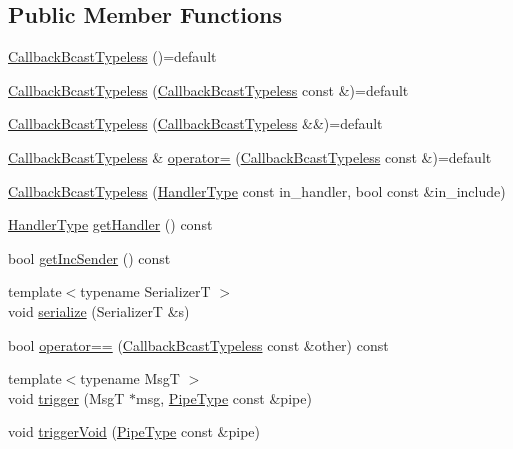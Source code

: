 \subsection*{Public Member Functions}
\begin{DoxyCompactItemize}
\item 
\hyperlink{structvt_1_1pipe_1_1callback_1_1_callback_bcast_typeless_a4f41ee712c6d8359f2702731cdb508e0}{Callback\+Bcast\+Typeless} ()=default
\item 
\hyperlink{structvt_1_1pipe_1_1callback_1_1_callback_bcast_typeless_a21bda4efe28c82f442bf0881b1148196}{Callback\+Bcast\+Typeless} (\hyperlink{structvt_1_1pipe_1_1callback_1_1_callback_bcast_typeless}{Callback\+Bcast\+Typeless} const \&)=default
\item 
\hyperlink{structvt_1_1pipe_1_1callback_1_1_callback_bcast_typeless_a47d8224353671c6a7769abaed3a032ed}{Callback\+Bcast\+Typeless} (\hyperlink{structvt_1_1pipe_1_1callback_1_1_callback_bcast_typeless}{Callback\+Bcast\+Typeless} \&\&)=default
\item 
\hyperlink{structvt_1_1pipe_1_1callback_1_1_callback_bcast_typeless}{Callback\+Bcast\+Typeless} \& \hyperlink{structvt_1_1pipe_1_1callback_1_1_callback_bcast_typeless_acad87bb1887561979d41c298896463e3}{operator=} (\hyperlink{structvt_1_1pipe_1_1callback_1_1_callback_bcast_typeless}{Callback\+Bcast\+Typeless} const \&)=default
\item 
\hyperlink{structvt_1_1pipe_1_1callback_1_1_callback_bcast_typeless_a0681b9d932d75c7c1390e8297258584e}{Callback\+Bcast\+Typeless} (\hyperlink{namespacevt_af64846b57dfcaf104da3ef6967917573}{Handler\+Type} const in\+\_\+handler, bool const \&in\+\_\+include)
\item 
\hyperlink{namespacevt_af64846b57dfcaf104da3ef6967917573}{Handler\+Type} \hyperlink{structvt_1_1pipe_1_1callback_1_1_callback_bcast_typeless_a15f773a711d9771b8c60683de2762bc8}{get\+Handler} () const
\item 
bool \hyperlink{structvt_1_1pipe_1_1callback_1_1_callback_bcast_typeless_a3a93cb6e0ac25c14edfece0d19feff23}{get\+Inc\+Sender} () const
\item 
{\footnotesize template$<$typename SerializerT $>$ }\\void \hyperlink{structvt_1_1pipe_1_1callback_1_1_callback_bcast_typeless_ad8a8822a82d979df798f8dcb57c8c4e6}{serialize} (SerializerT \&s)
\item 
bool \hyperlink{structvt_1_1pipe_1_1callback_1_1_callback_bcast_typeless_a38b71fafbb0f2e6ce000eaa5faec463c}{operator==} (\hyperlink{structvt_1_1pipe_1_1callback_1_1_callback_bcast_typeless}{Callback\+Bcast\+Typeless} const \&other) const
\item 
{\footnotesize template$<$typename MsgT $>$ }\\void \hyperlink{structvt_1_1pipe_1_1callback_1_1_callback_bcast_typeless_a6a23e27691ce2e3789e5a5dc1a88ae0f}{trigger} (MsgT $\ast$msg, \hyperlink{namespacevt_ac9852acda74d1896f48f406cd72c7bd3}{Pipe\+Type} const \&pipe)
\item 
void \hyperlink{structvt_1_1pipe_1_1callback_1_1_callback_bcast_typeless_a4f46128a5ef56035c6e2874b5387907d}{trigger\+Void} (\hyperlink{namespacevt_ac9852acda74d1896f48f406cd72c7bd3}{Pipe\+Type} const \&pipe)
\end{DoxyCompactItemize}
